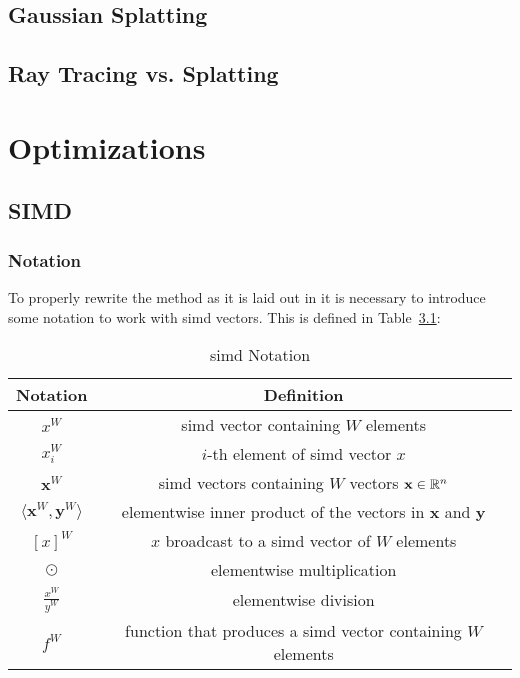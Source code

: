 \documentclass[a4paper, 11pt]{memoir}
\begin{document}
    \section{Gaussian Splatting}
    \cite{kerbl3Dgaussians}
    \cite{volume_splatting}

    \section{Ray Tracing vs. Splatting}

    \chapter{Optimizations}
    \section{SIMD}
    \subsection{Notation}
    To properly rewrite the method as it is laid out in \cite{Rhodin:2015} it is
    necessary to introduce some notation to work with \gls{simd} vectors. This is
    defined in Table~\ref{tab:notation}:
    \begin{table}[H]
        \centering
        \begin{tabular}{|c|c|}
            \hline
            Notation & Definition \\
            \hline
            $x^W$ & \gls{simd} vector containing $W$ elements\\
            $x^W_i$ & $i$-th element of \gls{simd} vector $x$\\
            $\mathbf{x}^W$ & \gls{simd} vectors containing $W$ vectors $\mathbf{x} \in \mathbb{R}^n$\\
            $\langle \mathbf{x}^W, \mathbf{y}^W \rangle$ & elementwise inner product of the vectors in $\mathbf{x}$ and $\mathbf{y}$\\
            $[ x ]^W$ & $x$ broadcast to a \gls{simd} vector of $W$ elements\\
            $\odot$ & elementwise multiplication\\
            $\frac{x^W}{y^W}$ & elementwise division\\
            $f^W$ & function that produces a \gls{simd} vector containing $W$ elements\\\hline
        \end{tabular}
        \caption{\gls{simd} Notation}
        \label{tab:notation}
    \end{table}
\end{document}
